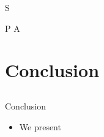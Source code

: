 \documentclass[handout]{beamer}
\begin{document}
\begin{frame}{S}
\begin{beamerboxesrounded}[upper=palette tertiary, shadow=true]{P}
  A
\end{beamerboxesrounded}

\end{frame}


\section{Conclusion}
\subsection{}
\begin{frame}{Conclusion}
\begin{itemize}[<+->]
	\item We present 
\end{itemize}

\end{frame}
\end{document}
